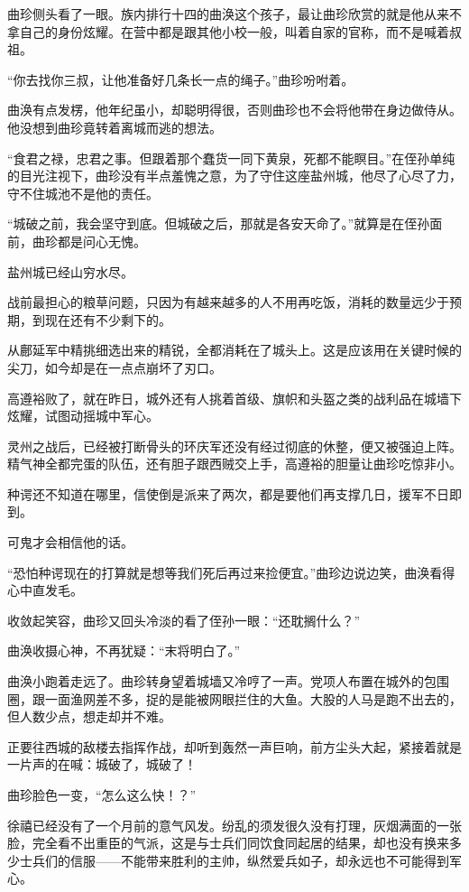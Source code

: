曲珍侧头看了一眼。族内排行十四的曲涣这个孩子，最让曲珍欣赏的就是他从来不拿自己的身份炫耀。在营中都是跟其他小校一般，叫着自家的官称，而不是喊着叔祖。

“你去找你三叔，让他准备好几条长一点的绳子。”曲珍吩咐着。

曲涣有点发楞，他年纪虽小，却聪明得很，否则曲珍也不会将他带在身边做侍从。他没想到曲珍竟转着离城而逃的想法。

“食君之禄，忠君之事。但跟着那个蠢货一同下黄泉，死都不能瞑目。”在侄孙单纯的目光注视下，曲珍没有半点羞愧之意，为了守住这座盐州城，他尽了心尽了力，守不住城池不是他的责任。

“城破之前，我会坚守到底。但城破之后，那就是各安天命了。”就算是在侄孙面前，曲珍都是问心无愧。

盐州城已经山穷水尽。

战前最担心的粮草问题，只因为有越来越多的人不用再吃饭，消耗的数量远少于预期，到现在还有不少剩下的。

从鄜延军中精挑细选出来的精锐，全都消耗在了城头上。这是应该用在关键时候的尖刀，如今却是在一点点崩坏了刃口。

高遵裕败了，就在昨日，城外还有人挑着首级、旗帜和头盔之类的战利品在城墙下炫耀，试图动摇城中军心。

灵州之战后，已经被打断骨头的环庆军还没有经过彻底的休整，便又被强迫上阵。精气神全都完蛋的队伍，还有胆子跟西贼交上手，高遵裕的胆量让曲珍吃惊非小。

种谔还不知道在哪里，信使倒是派来了两次，都是要他们再支撑几日，援军不日即到。

可鬼才会相信他的话。

“恐怕种谔现在的打算就是想等我们死后再过来捡便宜。”曲珍边说边笑，曲涣看得心中直发毛。

收敛起笑容，曲珍又回头冷淡的看了侄孙一眼：“还耽搁什么？”

曲涣收摄心神，不再犹疑：“末将明白了。”

曲涣小跑着走远了。曲珍转身望着城墙又冷哼了一声。党项人布置在城外的包围圈，跟一面渔网差不多，捉的是能被网眼拦住的大鱼。大股的人马是跑不出去的，但人数少点，想走却并不难。

正要往西城的敌楼去指挥作战，却听到轰然一声巨响，前方尘头大起，紧接着就是一片声的在喊：城破了，城破了！

曲珍脸色一变，“怎么这么快！？”

徐禧已经没有了一个月前的意气风发。纷乱的须发很久没有打理，灰烟满面的一张脸，完全看不出重臣的气派，这是与士兵们同饮食同起居的结果，却也没有换来多少士兵们的信服——不能带来胜利的主帅，纵然爱兵如子，却永远也不可能得到军心。

